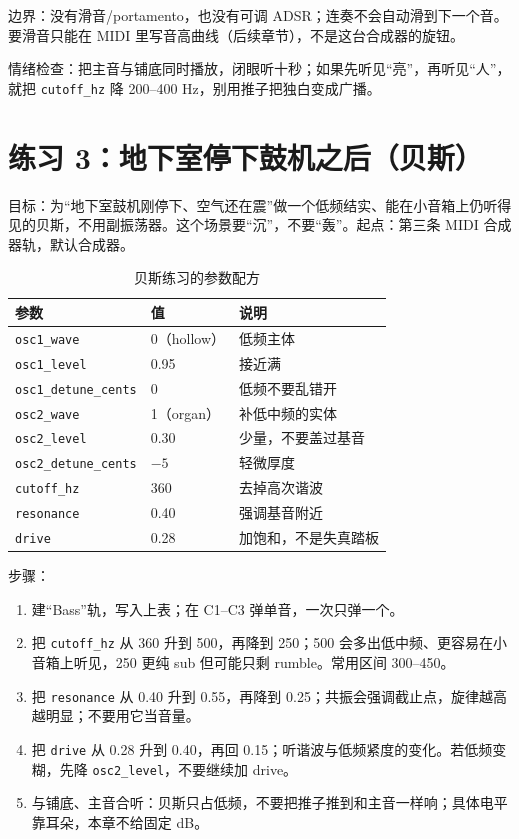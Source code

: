 边界：没有滑音/portamento，也没有可调 ADSR；连奏不会自动滑到下一个音。要滑音只能在 MIDI 里写音高曲线（后续章节），不是这台合成器的旋钮。

情绪检查：把主音与铺底同时播放，闭眼听十秒；如果先听见“亮”，再听见“人”，就把 \texttt{cutoff\_hz} 降 200–400 Hz，别用推子把独白变成广播。


\section{练习 3：地下室停下鼓机之后（贝斯）}

目标：为“地下室鼓机刚停下、空气还在震”做一个低频结实、能在小音箱上仍听得见的贝斯，不用副振荡器。这个场景要“沉”，不要“轰”。起点：第三条 MIDI 合成器轨，默认合成器。

\begin{table}[htbp]
\centering
\small
\begin{tabular}{@{}lll@{}}
\hline
参数 & 值 & 说明 \\
\hline
\texttt{osc1\_wave} & 0（hollow） & 低频主体 \\
\texttt{osc1\_level} & 0.95 & 接近满 \\
\texttt{osc1\_detune\_cents} & $0$ & 低频不要乱错开 \\
\texttt{osc2\_wave} & 1（organ） & 补低中频的实体 \\
\texttt{osc2\_level} & 0.30 & 少量，不要盖过基音 \\
\texttt{osc2\_detune\_cents} & $-5$ & 轻微厚度 \\
\texttt{cutoff\_hz} & 360 & 去掉高次谐波 \\
\texttt{resonance} & 0.40 & 强调基音附近 \\
\texttt{drive} & 0.28 & 加饱和，不是失真踏板 \\
\hline
\end{tabular}
\caption{贝斯练习的参数配方}
\label{tab:bass-recipe}
\end{table}

步骤：

\begin{enumerate}
  \item 建“Bass”轨，写入上表；在 C1–C3 弹单音，一次只弹一个。
  \item 把 \texttt{cutoff\_hz} 从 360 升到 500，再降到 250；500 会多出低中频、更容易在小音箱上听见，250 更纯 sub 但可能只剩 rumble。常用区间 300–450。
  \item 把 \texttt{resonance} 从 0.40 升到 0.55，再降到 0.25；共振会强调截止点，旋律越高越明显；不要用它当音量。
  \item 把 \texttt{drive} 从 0.28 升到 0.40，再回 0.15；听谐波与低频紧度的变化。若低频变糊，先降 \texttt{osc2\_level}，不要继续加 drive。
  \item 与铺底、主音合听：贝斯只占低频，不要把推子推到和主音一样响；具体电平靠耳朵，本章不给固定 dB。
\end{enumerate}

